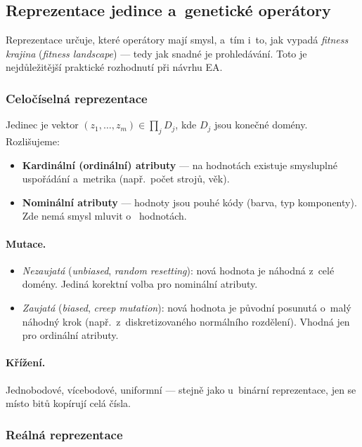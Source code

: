 \documentclass[11pt,a4paper]{article}
\theoremstyle{definition}
\begin{document}
\subsection{Reprezentace jedince a~genetické operátory}
\label{sec:reprez}

Reprezentace určuje, které operátory mají smysl, a~tím i~to, jak vypadá
\emph{fitness krajina} (\emph{fitness landscape}) --- tedy jak snadné je
prohledávání. Toto je nejdůležitější praktické rozhodnutí při návrhu EA.

\subsubsection{Celočíselná reprezentace}

Jedinec je vektor $(z_1,\dots,z_m) \in \prod_j D_j$, kde $D_j$ jsou konečné
domény. Rozlišujeme:
\begin{itemize}
\item \textbf{Kardinální (ordinální) atributy} --- na hodnotách existuje
  smysluplné uspořádání a~metrika (např.\ počet strojů, věk).
\item \textbf{Nominální atributy} --- hodnoty jsou pouhé kódy (barva, typ
  komponenty). Zde nemá smysl mluvit o~ hodnotách.
\end{itemize}

\paragraph{Mutace.}
\begin{itemize}
\item \emph{Nezaujatá} (\emph{unbiased}, \emph{random resetting}): nová hodnota
  je náhodná z~celé domény. Jediná korektní volba pro nominální atributy.
\item \emph{Zaujatá} (\emph{biased}, \emph{creep mutation}): nová hodnota je
  původní posunutá o~malý náhodný krok (např.\ z~diskretizovaného normálního
  rozdělení). Vhodná jen pro ordinální atributy.
\end{itemize}

\paragraph{Křížení.} Jednobodové, vícebodové, uniformní --- stejně jako
u~binární reprezentace, jen se místo bitů kopírují celá čísla.

\subsubsection{Reálná reprezentace}
\end{document}
